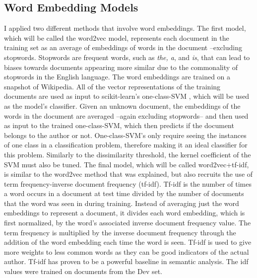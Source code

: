 \documentclass[11pt]{article}
\begin{document}
\subsection{Word Embedding Models}
I applied two different methods that involve word embeddings. The first model, which will be called the word2vec model, represents each document in the training set as an average of embeddings of words in the document --excluding stopwords. Stopwords are frequent words, such as \textit{the, a}, and \textit{is}, that can lead to biases towards documents appearing more similar due to the commonality of stopwords in the English language. The word embeddings are trained on a snapshot of Wikipedia. All of the vector representations of the training documents are used as input to scikit-learn's one-class-SVM \cite{scikit-learn}, which will be used as the model's classifier. Given an unknown document, the embeddings of the words in the document are averaged --again excluding stopwords-- and then used as input to the trained one-class-SVM, which then predicts if the document belongs to the author or not. One-class-SVM's only require seeing the instances of one class in a classification problem, therefore making it an ideal classifier for this problem. Similarly to the dissimilarity threshold, the kernel coefficient of the SVM must also be tuned. The final model, which will be called word2vec+tf-idf, is similar to the word2vec method that was explained, but also recruits the use of term frequency-inverse document frequency (tf-idf). Tf-idf is the number of times a word occurs in a document at test time divided by the number of documents that the word was seen in during training. Instead of averaging just the word embeddings to represent a document, it divides each word embedding, which is first normalized, by the word's associated inverse document frequency value. The term frequency is multiplied by the inverse document frequency through the addition of the word embedding each time the word is seen. Tf-idf is used to give more weights to less common words as they can be good indicators of the actual author. Tf-idf has proven to be a powerful baseline in semantic analysis. The idf values were trained on documents from the Dev set.
\end{document}
